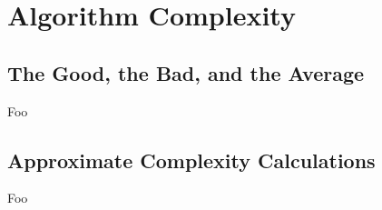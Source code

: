 \section{Algorithm Complexity}

\subsection{The Good, the Bad, and the Average}

Foo

\subsection{Approximate Complexity Calculations}

Foo

